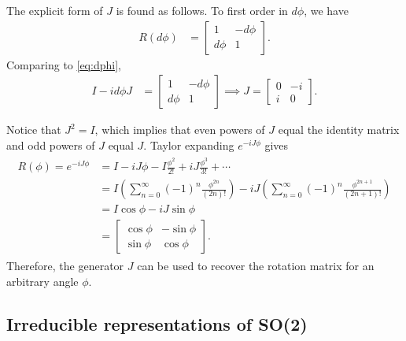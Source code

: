 The explicit form of $J$ is found as follows. To first order in $d\phi$, we have
\begin{align}
    R(d\phi) &= \begin{bmatrix}
        1 & -d\phi \\
        d\phi & 1
    \end{bmatrix}.
\end{align}
Comparing to \cref{eq:dphi},
\begin{align}
    I - i d\phi J &= \begin{bmatrix}
        1 & -d\phi \\
        d\phi & 1
    \end{bmatrix} \implies J = \begin{bmatrix}
        0 & -i \\
        i & 0
    \end{bmatrix}.
\end{align}

Notice that $J^2 = I$, which implies that even powers of $J$ equal the identity matrix and odd powers of $J$ equal $J$. Taylor expanding $e^{-iJ\phi }$ gives
\begin{align}
    \begin{split}        
    R(\phi) = e^{-iJ\phi} &= I - iJ\phi - I \frac{\phi^2}{2!} + iJ\frac{\phi^3}{3!} + \cdots \\
    &= I\left( \sum_{n=0}^{\infty} {(-1)}^n \frac{\phi^{2n}}{(2n)!} \right) - iJ\left( \sum_{n=0}^{\infty} {(-1)}^n \frac{\phi^{2n+1}}{(2n+1)!} \right) \\
    &= I\cos\phi - iJ\sin\phi \\
    &= \begin{bmatrix}
        \cos\phi & -\sin\phi \\
        \sin\phi & \cos\phi
    \end{bmatrix}.
    \end{split}
\end{align}
Therefore, the generator $J$ can be used to recover the rotation matrix for an arbitrary angle $\phi$.

\subsection{Irreducible representations of SO(2)}\label{sub:irr_so2}

